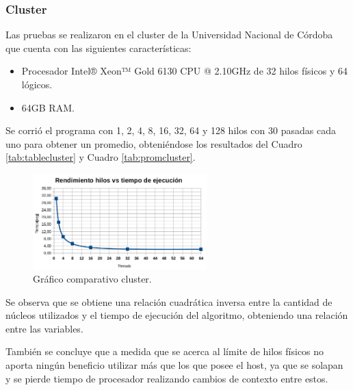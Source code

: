 \documentclass[a4paper]{article}
\begin{document}
\subsubsection{Cluster}
Las pruebas se realizaron en el cluster de la Universidad Nacional de Córdoba que cuenta con las siguientes características:
\begin{itemize}
\item Procesador Intel® Xeon™ Gold 6130 CPU @ 2.10GHz de 32 hilos físicos y 64 lógicos.
\item 64GB RAM.
\end{itemize}
Se corrió el programa con 1, 2, 4, 8, 16, 32, 64 y 128 hilos con 30 pasadas cada uno para obtener un promedio, obteniéndose los resultados del Cuadro \ref{tab:tablecluster} y Cuadro \ref{tab:promcluster}.


\begin{figure}[H]
	\begin{center}		
	\includegraphics[width=0.6\textwidth]{003.png}
  	\caption{Gráfico comparativo cluster.}
  	\label{fig:grafcluster}
  	\end{center}
\end{figure}

Se observa que se obtiene una relación cuadrática inversa entre la cantidad de núcleos utilizados y el tiempo de ejecución del algoritmo, obteniendo una relación entre las variables.

También se concluye que a medida que se acerca al límite de hilos físicos no aporta ningún beneficio utilizar más que los que posee el host, ya que se solapan y se pierde tiempo de procesador realizando cambios de contexto entre estos.
\end{document}
